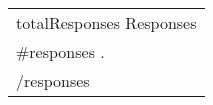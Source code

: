 {
\begin{longtable}{p{\linewidth}}
	\multicolumn{1}{r}{ {{totalResponses}} Responses } \\
	{{#responses}}
	{{{.}}} \\
	{{/responses}}
\end{longtable}
}
\tagstructend